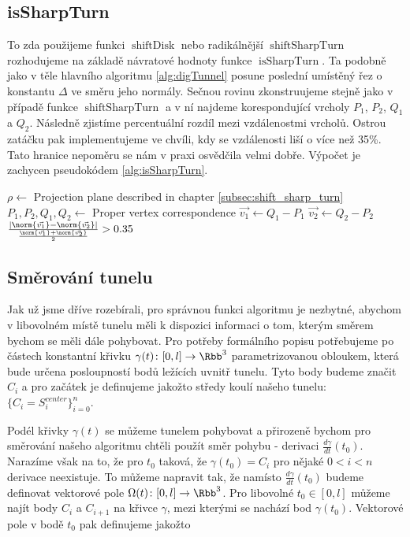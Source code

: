 \subsection{isSharpTurn} \label{subsec:is_sharp_turn}
To zda použijeme funkci $ \operatorname{shiftDisk} $ nebo radikálnější
$ \operatorname{shiftSharpTurn} $ rozhodujeme na základě návratové hodnoty
funkce $ \operatorname{isSharpTurn} $. Ta podobně jako v těle hlavního
algoritmu \ref{alg:digTunnel} posune poslední umístěný řez o konstantu
$ \Delta $ ve směru jeho normály. Sečnou rovinu zkonstruujeme stejně jako v
případě funkce $ \operatorname{shiftSharpTurn} $ a v ní najdeme korespondující
vrcholy $ P_1$, $P_2$, $Q_1$ a $ Q_2 $. Následně zjistíme percentuální rozdíl
mezi vzdálenostmi vrcholů. Ostrou zatáčku pak implementujeme ve chvíli, kdy se
vzdálenosti liší o více než 35\%. Tato hranice nepoměru se nám v praxi osvědčila
velmi dobře. Výpočet je zachycen pseudokódem \ref{alg:isSharpTurn}.

\begin{algorithmic}[1]
\label{alg:isSharpTurn}

    \State $ \rho \gets $ Projection plane described in chapter \ref{subsec:shift_sharp_turn}
    \State $ P_1, P_2, Q_1, Q_2 \gets $ Proper vertex correspondence
    \State $ \vec{v_1} \gets Q_1 - P_1 $
    \State $ \vec{v_2} \gets Q_2 - P_2 $
    \State \Return $ \frac{\left| \norm{\vec{v_1}} - \norm{\vec{v_2}} \right|}
                          {\frac{\norm{\vec{v_1}} + \norm{\vec{v_2}}}{2}} > 0.35$
\EndFunction

\end{algorithmic}





\subsection{Směrování tunelu} \label{subsec:tunnel_dir}
Jak už jsme dříve rozebírali, pro správnou funkci algoritmu je nezbytné, abychom
v libovolném místě tunelu měli k dispozici informaci o tom, kterým směrem bychom
se měli dále pohybovat. Pro potřeby formálního popisu potřebujeme
po částech konstantní křivku $ \gamma(t) \colon [0, l] \to \Rbb^3$
parametrizovanou obloukem, která bude
určena posloupností bodů ležících uvnitř tunelu. Tyto body budeme značit
$ C_i $ a pro začátek je definujeme jakožto středy koulí našeho tunelu:
$ \{C_i = S_i^{center}\}_{i=0}^{n} $.

Podél křivky $ \gamma(t) $ se můžeme tunelem pohybovat a přirozeně bychom pro
směrování našeho algoritmu chtěli použít směr pohybu - derivaci
$ \frac{d\gamma}{dt}(t_0) $. Narazíme však na to, že pro $ t_0 $ taková, že
$ \gamma(t_0) = C_i $ pro nějaké $ 0 < i < n $ derivace neexistuje. To můžeme
napravit tak, že namísto $ \frac{d\gamma}{dt}(t_0) $ budeme definovat vektorové
pole $ \Omega(t) \colon [0, l] \to \Rbb^3 $. Pro libovolné $ t_0 \in [0, l] $
můžeme najít body $ C_i $ a $ C_{i + 1} $ na křivce $ \gamma $, mezi kterými
se nachází bod $ \gamma(t_0) $. Vektorové pole v bodě $ t_0 $ pak definujeme
jakožto

